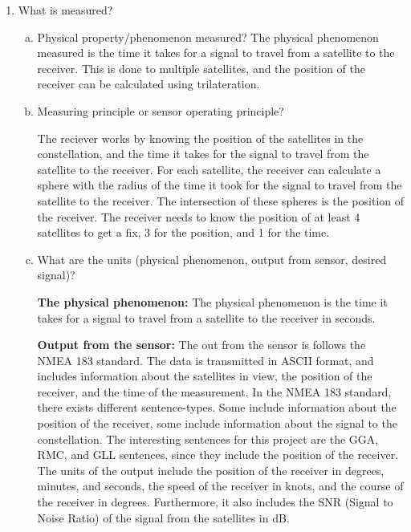 \begin{enumerate}
    \item What is measured?
    \begin{enumerate}[(a)]
        \item Physical property/phenomenon measured?
        The physical phenomenon measured is the time it takes for a signal to travel from a satellite to the receiver.
        This is done to multiple satellites, and the position of the receiver can be calculated using trilateration.

        \item Measuring principle or sensor operating principle?

        The reciever works by knowing the position of the satellites in the constellation, and the time it takes for the signal to travel from the satellite to the receiver.
        For each satellite, the receiver can calculate a sphere with the radius of the time it took for the signal to travel from the satellite to the receiver.
        The intersection of these spheres is the position of the receiver.
        The receiver needs to know the position of at least 4 satellites to get a fix, 3 for the position, and 1 for the time.


        \item What are the units (physical phenomenon, output from sensor, desired signal)?

        \textbf{The physical phenomenon:}
        The physical phenomenon is the time it takes for a signal to travel from a satellite to the receiver in seconds.

        \textbf{Output from the sensor:}
        The out from the sensor is follows the NMEA 183 standard.
        The data is transmitted in ASCII format, and includes information about the satellites in view, the position of the receiver, and the time of the measurement.
        In the NMEA 183 standard, there exists different sentence-types.
        Some include information about the position of the receiver, some include information about the signal to the constellation.
        The interesting sentences for this project are the GGA, RMC, and GLL sentences, since they include the position of the receiver.
        The units of the output include the position of the receiver in degrees, minutes, and seconds, the speed of the receiver in knots, and the course of the receiver in degrees.
        Furthermore, it also includes the SNR (Signal to Noise Ratio) of the signal from the satellites in dB.



\end{enumerate}
\end{enumerate}
